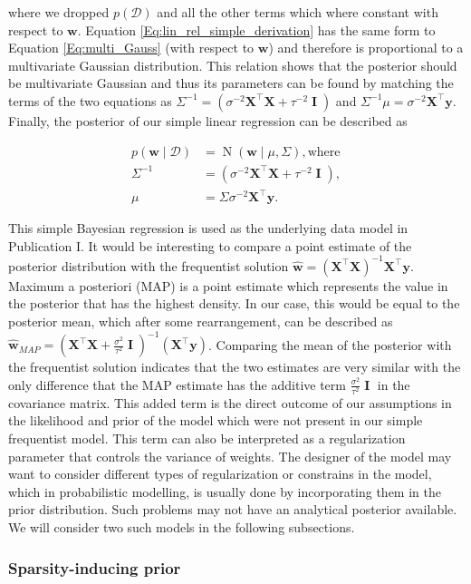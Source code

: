 \documentclass[dissertation,math,vertlayout,pdfa,colorlinks]{aaltoseries}
\newcommand{\bw}{\bm{w}}
\newcommand{\bX}{\bm{X}}
\newcommand{\by}{\bm{y}}
\newcommand{\bD}{\mathcal{D}}
\DeclareMathOperator{\eye}{\textbf{I}}
\DeclareMathOperator{\normalpdf}{N}
\newcommand{\tp}{^{\top}}
\begin{document}
\noindent where we dropped $p(\bD)$ and all the other terms which where constant with respect to $\bw$. Equation \ref{Eq:lin_rel_simple_derivation} has the same form to Equation \ref{Eq:multi_Gauss} (with respect to $\bm{w}$) and therefore is proportional to a multivariate Gaussian distribution. This relation shows that the posterior should be multivariate Gaussian and thus its parameters can be found by matching the terms of the two equations as $\Sigma^{-1} = ( \sigma^{-2}\bX\tp\bX + \tau^{-2} \eye ) $ and $\Sigma^{-1}\mu = \sigma^{-2}\bX\tp\by$. Finally, the posterior of our simple linear regression can be described as 

\begin{align}\label{Eq:lin_rel_simple_posterior}
	p(\bm{w} \mid \bD) &= \normalpdf(\bw \mid \mu,\Sigma), \text{where}\\
	\Sigma^{-1} &= (\sigma^{-2}\bX\tp\bX + \tau^{-2} \eye ), \nonumber\\
	\mu &= \Sigma\sigma^{-2}\bX\tp\by. \nonumber
\end{align}

This simple Bayesian regression is used as the underlying data model in Publication I. It would be interesting to compare a point estimate of the posterior distribution with the frequentist solution $\hat{\bw} = (\bX \tp \bX)^{-1}\bX\tp \by$. Maximum a posteriori (MAP) is a point estimate which represents the value in the posterior that has the highest density. In our case, this would be equal to the posterior mean, which after some rearrangement, can be described as $\hat{\bw}_{MAP} = (\bX\tp\bX + \frac{\sigma^{2}}{\tau^{2}} \eye )^{-1}(\bX\tp\by)$. Comparing the mean of the posterior with the frequentist solution indicates that the two estimates are very similar with the only difference that the MAP estimate has the additive term $\frac{\sigma^{2}}{\tau^{2}} \eye$ in the covariance matrix. This added term is the direct outcome of our assumptions in the likelihood and prior of the model which were not present in our simple frequentist model. This term can also be interpreted as a regularization parameter that controls the variance of weights. The designer of the model may want to consider different types of regularization or constrains in the model, which in probabilistic modelling, is usually done by incorporating them in the prior distribution. Such problems may not have an analytical posterior available. We will consider two such models in the following subsections.




\subsubsection{Sparsity-inducing prior}
\end{document}

